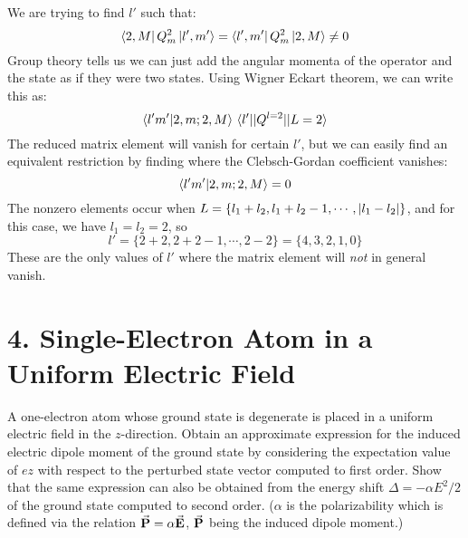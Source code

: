 \documentclass[a4paper,twoside]{article}
\begin{document}
\begin{problem}
    We are trying to find $ l' $ such that:
    \begin{equation}
        \bra{2,M} Q^2_m\ket{l',m'} =\bra{l',m'} Q^2_m\ket{2,M} \neq 0
    \end{equation}
    Group theory tells us we can just add the angular momenta of the operator and the state as if they were two states. Using Wigner Eckart theorem, we can write this as:
    \begin{equation}
        \bra{l'm'}\ket{2,m;2,M} \mel{l'}{|Q^{l=2}|}{L=2}
    \end{equation}
    The reduced matrix element will vanish for certain $ l' $, but we can easily find an equivalent restriction by finding where the Clebsch-Gordan coefficient vanishes:
    \begin{equation}
        \bra{l'm'}\ket{2,m;2,M} = 0
    \end{equation}
    The nonzero elements occur when $ L = \{l_1 + l_2, l_1 + l_2 - 1,\cdots, \abs{l_1 - l_2} \} $, and for this case, we have $ l_1 = l_2 = 2 $, so
    \begin{equation}
        l' = \{2+2, 2+2-1, \cdots, 2-2\} = \{4,3,2,1,0\}
    \end{equation}
    These are the only values of $ l' $ where the matrix element will \textit{not} in general vanish.
\end{problem}

\section*{4. Single-Electron Atom in a Uniform Electric Field}
A one-electron atom whose ground state is degenerate is placed in a uniform electric field in the $ z $-direction. Obtain an approximate expression for the induced electric dipole moment of the ground state by considering the expectation value of $ ez $ with respect to the perturbed state vector computed to first order. Show that the same expression can also be obtained from the energy shift $ \Delta = - \alpha E^2 / 2 $ of the ground state computed to second order. ($\alpha$ is the polarizability which is defined via the relation $ \va{P} = \alpha \va{E} $, $ \va{P} $ being the induced dipole moment.)
\end{document}
